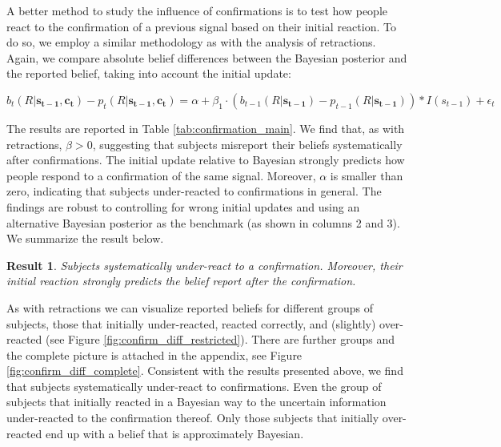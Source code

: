 \documentclass{article}
\newtheorem{result}{Result}
\newenvironment{Result}{\begin{result} \rm }{\end{result}}
\begin{document}
A better method to study the influence of confirmations is to test how people react to the confirmation of a previous signal based on their initial reaction. To do so, we employ a similar methodology as with the analysis of retractions. Again, we compare absolute belief differences between the Bayesian posterior and the reported belief, taking into account the initial update:

\begin{equation}
\label{reg:confirmation_simple}
    b_t(R|\mathbf{s_{t-1}},\mathbf{c_t})-p_{t}(R|\mathbf{s_{t-1}},\mathbf{c_t})=\alpha + \beta_1 \cdot (b_{t-1}(R|\mathbf{s_{t-1}})-p_{t-1}(R|\mathbf{s_{t-1}}))*I(s_{t-1})+\epsilon_t
\end{equation}

The results are reported in Table \ref{tab:confirmation_main}. We find that, as with retractions, $\beta>0$, suggesting that subjects misreport their beliefs systematically after confirmations. The initial update relative to Bayesian strongly predicts how people respond to a confirmation of the same signal. Moreover, $\alpha$ is smaller than zero, indicating that subjects under-reacted to confirmations in general. The findings are robust to controlling for wrong initial updates and using an alternative Bayesian posterior as the benchmark (as shown in columns 2 and 3). We summarize the result below.

\begin{Result}
\label{res:confirm}
Subjects systematically under-react to a confirmation. Moreover, their initial reaction strongly predicts the belief report after the confirmation.
\end{Result}

As with retractions we can visualize reported beliefs for different groups of subjects, those that initially under-reacted, reacted correctly, and (slightly) over-reacted (see Figure \ref{fig:confirm_diff_restricted}). There are further groups and the complete picture is attached in the appendix, see Figure \ref{fig:confirm_diff_complete}. Consistent with the results presented above, we find that subjects systematically under-react to confirmations. Even the group of subjects that initially reacted in a Bayesian way to the uncertain information under-reacted to the confirmation thereof. Only those subjects that initially over-reacted end up with a belief that is approximately Bayesian. 
\end{document}
